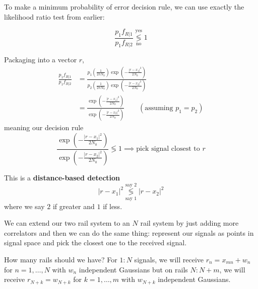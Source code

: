\documentclass[12pt]{report}
\newcommand{\abs}[1]{\left\vert #1 \right\vert}
\newcommand*{\tbf}[1]{\ifmmode\mathbf{#1}\else\textbf{#1}\fi}
\begin{document}
\begin{center}
\end{center}

To make a minimum probability of error decision rule, we can use exactly the likelihood ratio test from earlier: 

\[\frac{p_1 f_{R | 1}}{p_1 f_{R|2}} \overset{\text{yes}}{\underset{\text{no}}{\lessgtr}} 1\]

Packaging into a vector $r$, 
\begin{align*}
    \frac{p_1 f_{R | 1}}{p_1 f_{R|2}} &= \frac{p_1 \left(\frac{1}{2\pi N_0}\right) \exp\left(-\frac{\abs{r - x_1}^2}{2N_0}\right) }{p_2 \left(\frac{1}{2\pi N_0}\right) \exp\left(-\frac{\abs{r - x_2}^2}{2N_0}\right) }\\ 
    &= \frac{\exp\left(-\frac{\abs{r - x_1}^2}{2N_0}\right) }{ \exp\left(-\frac{\abs{r - x_2}^2}{2N_0}\right) } \qquad (\text{assuming } p_1 = p_2)
\end{align*}
meaning our decision rule 
\[\frac{\exp\left(-\frac{\abs{r - x_1}^2}{2N_0}\right) }{ \exp\left(-\frac{\abs{r - x_2}^2}{2N_0}\right) } \lessgtr 1 \implies \text{pick signal closest to } r\]

This is a \tbf{distance-based detection} 
\[\abs{r - x_1}^2 \overset{\text{say 2}}{\underset{\text{say 1}}{\lessgtr}} \abs{r - x_2}^2\]
where we say $2$ if greater and $1$ if less.

We can extend our two rail system to an $N$ rail system by just adding more correlators and then we can do the same thing: represent our signals as points in signal space and pick the closest one to the received signal.

How many rails should we have? For $1:N$ signals, we will receive $r_{n} = x_{mn} + w_n$ for $n = 1, \dots, N$ with $w_n$ independent Gaussians but on rails $N:N+m$, we will receive $r_{N+k} = w_{N+k}$ for $k = 1, \dots, m$ with $w_{N+k}$ independent Gaussians.
\end{document}

